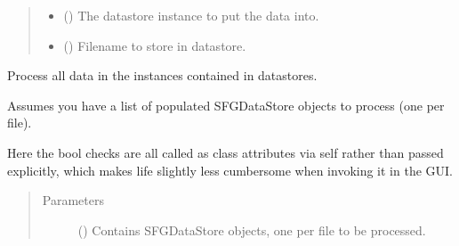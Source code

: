 \documentclass[a4paper,10pt,english]{sphinxmanual}
\begin{document}
\begin{fulllineitems}
\begin{fulllineitems}
\begin{quote}
\begin{description}
\begin{itemize}
\item {} 
\sphinxAtStartPar
{} () \textendash{} The datastore instance to put the data into.

\item {} 
\sphinxAtStartPar
{} () \textendash{} Filename to store in datastore.

\end{itemize}

\end{description}\end{quote}

\end{fulllineitems}


\begin{fulllineitems}
\label{\detokenize{sfgtools:sfgtools.SFGProcessTools.batch_process}}
\sphinxAtStartPar
Process all data in the instances contained in datastores.

\sphinxAtStartPar
Assumes you have a list of populated SFGDataStore objects to process (one per file).

\sphinxAtStartPar
Here the bool checks are all called as class attributes via self rather than passed explicitly,
which makes life slightly less cumbersome when invoking it in the GUI.
\begin{quote}\begin{description}
\item[{Parameters}] \leavevmode
\sphinxAtStartPar
{} () \textendash{} Contains SFGDataStore objects, one per file to be processed.

\end{description}\end{quote}

\end{fulllineitems}



\end{fulllineitems}
\end{document}
